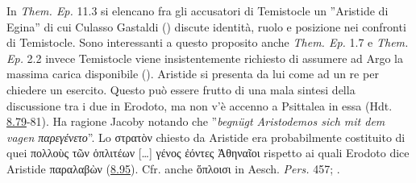 {\begin{itemize}
    \end{itemize}
    In \emph{Them. Ep.}  11.3 si elencano fra gli accusatori di Temistocle un ''Aristide di Egina'' di cui Culasso Gastaldi (\cite*[126 e 130-132]{CulassoGastaldi1990}) discute identità, ruolo e posizione nei confronti di Temistocle. Sono interessanti a questo proposito anche \emph{Them. Ep.}  1.7 e  \emph{Them. Ep.}  2.2 invece Temistocle viene insistentemente richiesto di assumere ad Argo la massima carica disponibile (\cite*[260]{CulassoGastaldi1990}). Aristide si presenta da lui come ad un re per chiedere un esercito. Questo può essere frutto di una mala sintesi della discussione tra i due in Erodoto, ma non v'è accenno a Psittalea in essa (Hdt. \href{http://data.perseus.org/citations/urn:cts:greekLit:tlg0016.tlg001.perseus-grc1:8.79}{8.79}-81). Ha ragione Jacoby notando che ''\emph{begnügt Aristodemos sich mit dem vagen \textgreek{παρεγένετο}}''. Lo \textgreek{στρατὸν} chiesto da Aristide era probabilmente costituito di quei \textgreek{πολλοὺς  τῶν  ὁπλιτέων […] γένος  ἐόντες  Ἀθηναῖοι} rispetto ai quali Erodoto dice Aristide \textgreek{παραλαβὼν} (\href{http://data.perseus.org/citations/urn:cts:greekLit:tlg0016.tlg001.perseus-grc1:8.95}{8.95}). Cfr. anche \textgreek{ὅπλοισι} in Aesch. \emph{Pers.} 457; \cite[210-11]{Garvie2009}.  
}
